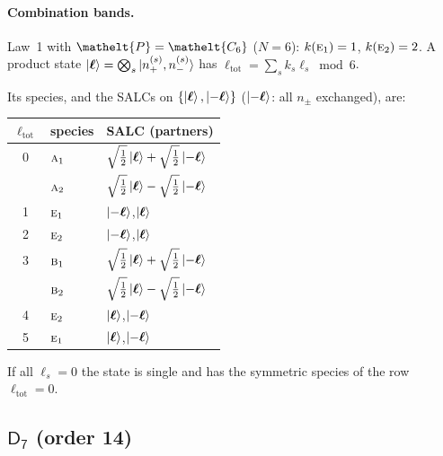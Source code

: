 \documentclass[11pt]{article}
\newcommand{\eltfont}[1]{{\let\sigma\eltsigma\mathelt{#1}}}
\newcommand{\grp}[1]{\mathsf{#1}}
\newcommand{\irr}[1]{\text{\normalfont\scshape #1}}
\newcommand{\elt}[1]{\eltfont{#1}}
\newcommand{\pel}{\elt{P}}             %
\begin{document}
\paragraph{Combination bands.}

Law~1 with $\pel=\elt{C_{6}}$ ($N=6$): $k(\irr{e}_{1})=1$, $k(\irr{e}_{2})=2$. A product state $\ket{\boldsymbol\ell}=\bigotimes_s\ket{n_+^{(s)},n_-^{(s)}}$ has $\ell_{\mathrm{tot}}=\sum_sk_s\ell_s\bmod 6$.

Its species, and the SALCs on $\{\ket{\boldsymbol\ell},\ket{-\boldsymbol\ell}\}$ ($\ket{-\boldsymbol\ell}$: all $n_\pm$ exchanged), are:

\begin{longtable}{c l l}\hline $\ell_{\mathrm{tot}}$ & species & SALC (partners)\\ \hline\endhead

0 & $\irr{a}_{1}$ & $\sqrt{\tfrac{1}{2}}\ket{\boldsymbol\ell}+\sqrt{\tfrac{1}{2}}\ket{-\boldsymbol\ell}$\\

 & $\irr{a}_{2}$ & $\sqrt{\tfrac{1}{2}}\ket{\boldsymbol\ell}-\sqrt{\tfrac{1}{2}}\ket{-\boldsymbol\ell}$\\

1 & $\irr{e}_{1}$ & $\ket{-\boldsymbol\ell}$,\quad $\ket{\boldsymbol\ell}$\\

2 & $\irr{e}_{2}$ & $\ket{-\boldsymbol\ell}$,\quad $\ket{\boldsymbol\ell}$\\

3 & $\irr{b}_{1}$ & $\sqrt{\tfrac{1}{2}}\ket{\boldsymbol\ell}+\sqrt{\tfrac{1}{2}}\ket{-\boldsymbol\ell}$\\

 & $\irr{b}_{2}$ & $\sqrt{\tfrac{1}{2}}\ket{\boldsymbol\ell}-\sqrt{\tfrac{1}{2}}\ket{-\boldsymbol\ell}$\\

4 & $\irr{e}_{2}$ & $\ket{\boldsymbol\ell}$,\quad $\ket{-\boldsymbol\ell}$\\

5 & $\irr{e}_{1}$ & $\ket{\boldsymbol\ell}$,\quad $\ket{-\boldsymbol\ell}$\\

\hline\end{longtable}

If all $\ell_s=0$ the state is single and has the symmetric species of the row $\ell_{\mathrm{tot}}=0$.

\subsection*{$\grp{D_{7}}$ \quad (order 14)}
\end{document}
